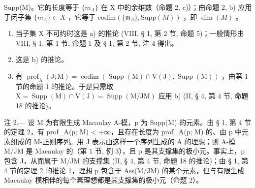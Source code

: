 Supp(M)。它的长度等于 \(\{m_{A}\}\) 在 X 中的余维数（命题 2, c)）；由命题 2, b) 应用于闭子集 \(\{m_{A}\}\subset X\) ，它等于 \(\text{codim}(\{\mathfrak{m}_{\Lambda}\},\text{Supp}(M))\) ，即 \(\dim(M)\) 。

\begin{enumerate}
\def\labelenumi{\alph{enumi})}
\setcounter{enumi}{1}
\item
  当子集 X 不可约时这是 a) 的推论 (VIII, § 1, 第 2 节, 命题 5)；一般情形由 VIII, § 1, 第 1 节, 命题 1 及 § 1, 第 2 节, 注 4 得出。
\item
  这是 b) 的推论。
\item
  有 \(\operatorname{prof}_{\mathrm{A}}(\mathrm{J};\mathrm{M}) = \operatorname{codim}(\operatorname{Supp}(\mathrm{M})\cap \mathrm{V}(\mathrm{J}),\operatorname{Supp}(\mathrm{M}))\) ，由第 1 节的命题 1 的推论。于是只需取 \(\mathrm{X} = \operatorname{Supp}(\mathrm{M})\cap \mathrm{V}(\mathrm{J}) = \operatorname{Supp}(\mathrm{M} / \mathrm{JM})\) 应用 b) (II, § 4, 第 4 节, 命题 18 的推论)。
\end{enumerate}

注 2.--- 设 M 为有限生成 Macaulay A-模，p 为 Supp(M) 的元素。由 § 1, 第 4 节的定理 2，有 prof\_A(p; M) \textless{} +∞，且存在长度为 prof\_A(p; M) 的、由 p 中元素组成的 M-正则序列。用 J 表示由这样一个序列生成的 A 的理想；则 A-模 M/JM 是 Macaulay 的（第 1 节, 例 3），且 p 是其支撑集的极小元。事实上，p 包含 J，从而属于 M/JM 的支撑集 (II, § 4, 第 4 节, 命题 18 的推论)；由 § 1, 第 4 节的定理 2 的推论 1，理想 p 包含于 Ass(M/JM) 的某个元素，但与有限生成 Macaulay 模相伴的每个素理想都是其支撑集的极小元（命题 2）。
\relax{}

